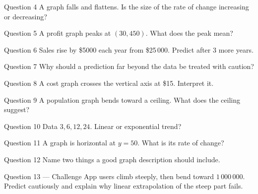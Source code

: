 \documentclass[11pt]{article}
\begin{document}
\begin{qbox}{Question 4}
A graph falls and flattens. Is the size of the rate of change increasing or decreasing?\workspace{2.4cm}
\end{qbox}

\begin{qbox}{Question 5}
A profit graph peaks at $(30,450)$. What does the peak mean?\workspace{2.4cm}
\end{qbox}

\begin{qbox}{Question 6}
Sales rise by \$5000 each year from \$25\,000. Predict after $3$ more years.\workspace{2.4cm}
\end{qbox}

\begin{qbox}{Question 7}
Why should a prediction far beyond the data be treated with caution?\workspace{2.4cm}
\end{qbox}

\begin{qbox}{Question 8}
A cost graph crosses the vertical axis at \$15. Interpret it.\workspace{2.4cm}
\end{qbox}

\begin{qbox}{Question 9}
A population graph bends toward a ceiling. What does the ceiling suggest?\workspace{2.4cm}
\end{qbox}

\begin{qbox}{Question 10}
Data $3,6,12,24$. Linear or exponential trend?\workspace{2.4cm}
\end{qbox}

\begin{qbox}{Question 11}
A graph is horizontal at $y=50$. What is its rate of change?\workspace{2.4cm}
\end{qbox}

\begin{qbox}{Question 12}
Name two things a good graph description should include.\workspace{2.4cm}
\end{qbox}

\begin{qbox}{Question 13 --- Challenge}
App users climb steeply, then bend toward $1\,000\,000$. Predict cautiously and explain why linear extrapolation of the steep part fails.\workspace{3.2cm}
\end{qbox}

\clearpage
{}
\end{document}
